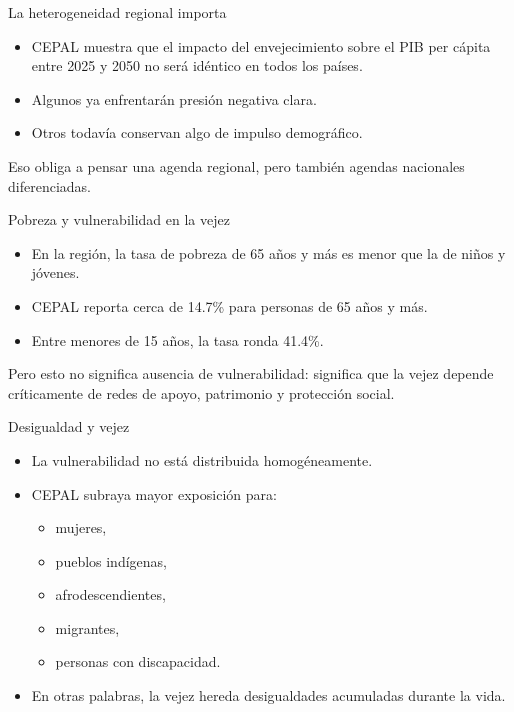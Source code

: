 \documentclass{beamer}
\begin{document}
\begin{frame}{La heterogeneidad regional importa}
\begin{itemize}
    \item CEPAL muestra que el impacto del envejecimiento sobre el PIB per cápita entre 2025 y 2050 no será idéntico en todos los países.
    \item Algunos ya enfrentarán presión negativa clara.
    \item Otros todavía conservan algo de impulso demográfico.
\end{itemize}

\vspace{0.3cm}
Eso obliga a pensar una agenda regional, pero también agendas nacionales diferenciadas.
\end{frame}

\begin{frame}{Pobreza y vulnerabilidad en la vejez}
\begin{itemize}
    \item En la región, la tasa de pobreza de 65 años y más es menor que la de niños y jóvenes.
    \item CEPAL reporta cerca de 14.7\% para personas de 65 años y más.
    \item Entre menores de 15 años, la tasa ronda 41.4\%.
\end{itemize}

\vspace{0.3cm}
Pero esto no significa ausencia de vulnerabilidad: significa que la vejez depende críticamente de redes de apoyo, patrimonio y protección social.
\end{frame}

\begin{frame}{Desigualdad y vejez}
\begin{itemize}
    \item La vulnerabilidad no está distribuida homogéneamente.
    \item CEPAL subraya mayor exposición para:
    \begin{itemize}
        \item mujeres,
        \item pueblos indígenas,
        \item afrodescendientes,
        \item migrantes,
        \item personas con discapacidad.
    \end{itemize}
    \item En otras palabras, la vejez hereda desigualdades acumuladas durante la vida.
\end{itemize}
\end{frame}
\end{document}
